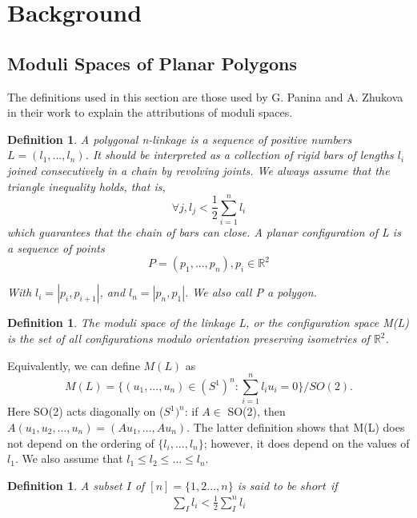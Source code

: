 \documentclass{amsart}
\newtheorem{Definition}[theorem]{Definition}
\newenvironment{definition}{\begin{Definition}\normalfont}{\end{Definition}}
\begin{document}
\section{Background}
\subsection{Moduli Spaces of Planar Polygons}
The definitions used in this section are those used by G. Panina and A. Zhukova in their work to explain the attributions of moduli spaces. 
\begin{definition}
\cite{PANZU} A \textit{polygonal n-linkage} is a sequence of positive numbers ${L} = ({l_1,...,l_n})$. It should be interpreted as a collection of rigid bars of lengths ${l_i}$ joined consecutively in a chain by revolving joints. We always assume that the triangle inequality holds, that is,
\begin{equation}
\forall j, {l_j} < \frac{1}{2} \sum_{i=1}^{n} {l_i}
\end{equation}
which guarantees that the chain of bars can close.
A \textit{planar configuration} of L is a sequence of points
\begin{equation}
P= (p_1, ... , p_n), {p_i} \in \mathbb{R}^2
\end{equation}

With ${l_i} = |p_i, p_{i+1}|$, and ${l_n} = |p_n, p_1|$. We also call P a \textit{polygon}.
\end{definition}
\begin{definition} 
\cite{PANZU}The \textit{moduli space of the linkage L}, or the \textit{configuration space} M(L) is the set of all configurations modulo orientation preserving isometries of $\mathbb{R}^2$.\\
\end{definition}
Equivalently, we can define $M(L)$ as
\begin{equation}
M(L) = \{(u_{1}, ..., u_{n}) \in (S^1)^{n} : \sum_{i=1}^{n} l_{i}u_{i} = 0\}/SO(2).
\end{equation}
Here SO(2) acts diagonally on ($S^{1})^{n}$: if $A \in$ SO(2), then $A(u_1, u_2, …, u_n) = (Au_{1}, …, Au_{n})$.
The latter definition shows that M(L) does not depend on the ordering of $\{l_{i},..., l_{n}\}$; 
however, it does depend on the values of $l_{1}$. We also assume that $l_1\leq l_2\leq\ldots\leq l_n$.
\begin{definition}
A subset $I$ of $[n]=\{1,2...,n\}$ is said to be $short$ if\\ 
\begin{align}
\sum_{I} l_i <\frac{1}{2}\sum_{I}^{n}l_i 
\end{align}
\end{definition}
\end{document}
